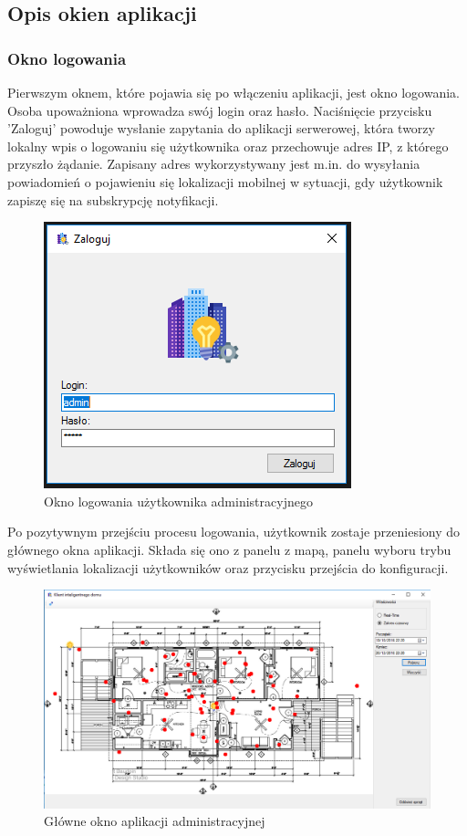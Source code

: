 \subsection{Opis okien aplikacji}
\subsubsection{Okno logowania}
Pierwszym oknem, które pojawia się po włączeniu aplikacji, jest okno logowania. Osoba upoważniona wprowadza swój login oraz hasło. Naciśnięcie przycisku 'Zaloguj' powoduje wysłanie zapytania do aplikacji serwerowej, która tworzy lokalny wpis o logowaniu się użytkownika oraz przechowuje adres IP, z którego przyszło żądanie. Zapisany adres wykorzystywany jest m.in. do wysyłania powiadomień o pojawieniu się lokalizacji mobilnej w sytuacji, gdy użytkownik zapiszę się na subskrypcję notyfikacji.\\
\begin{figure}[H]			
	\centering
	\caption{Okno logowania użytkownika administracyjnego}
	\includegraphics{okno_logowania}
\end{figure}
Po pozytywnym przejściu procesu logowania, użytkownik zostaje przeniesiony do głównego okna aplikacji. Składa się ono z panelu z mapą, panelu wyboru trybu wyświetlania lokalizacji użytkowników oraz przycisku przejścia do konfiguracji.
\begin{figure}[H]			
	\centering
	\caption{Główne okno aplikacji administracyjnej}
	\includegraphics[width=1.0\textwidth]{okno_glowne}
\end{figure}
